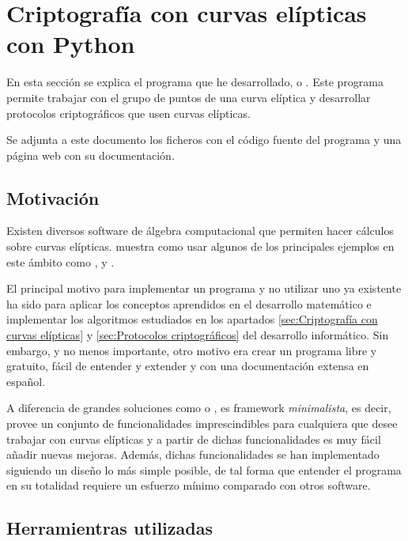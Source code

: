 \section{Criptografía con curvas elípticas con Python}
\label{sec:Criptografía con curvas elípticas con Python}

En esta sección se explica el programa que he desarrollado,  o . Este programa permite trabajar con el grupo de puntos de una curva elíptica y desarrollar protocolos criptográficos que usen curvas elípticas.

Se adjunta a este documento los ficheros con el código fuente del programa y una página web con su documentación.

\subsection{Motivación}
\label{sub:Motivación}

Existen diversos software de álgebra computacional que permiten hacer cálculos sobre curvas elípticas. \cite{Washington:2008} muestra como usar algunos de los principales ejemplos en este ámbito como ,  y .

El principal motivo para implementar un programa y no utilizar uno ya existente ha sido para aplicar los conceptos aprendidos en el desarrollo matemático e implementar los algoritmos estudiados en los apartados \ref{sec:Criptografía con curvas elípticas} y \ref{sec:Protocolos criptográficos} del desarrollo informático. Sin embargo, y no menos importante, otro motivo era crear un programa libre y gratuito,
fácil de entender y extender y con una documentación extensa en español.

A diferencia de grandes soluciones como  o ,  es framework \emph{minimalista}, es decir, provee un conjunto de funcionalidades imprescindibles para cualquiera que desee trabajar con curvas elípticas y a partir de dichas funcionalidades es muy fácil añadir nuevas mejoras. Además, dichas funcionalidades se han implementado siguiendo un diseño lo más simple posible, de tal forma que entender el programa en su totalidad requiere un esfuerzo mínimo comparado con otros software.

\subsection{Herramientras utilizadas}
\label{sub:Herramientras utilizadas}

